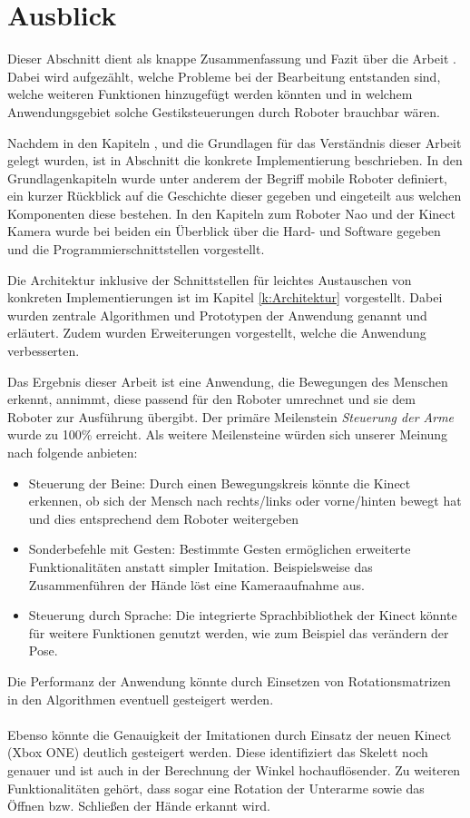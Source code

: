 \chapter{Ausblick}      %
Dieser Abschnitt dient als knappe Zusammenfassung und Fazit über die Arbeit \Titel. Dabei wird aufgezählt, welche Probleme bei der Bearbeitung entstanden sind, welche weiteren Funktionen hinzugefügt werden könnten und in welchem Anwendungsgebiet solche Gestiksteuerungen durch Roboter brauchbar wären.

Nachdem in den Kapiteln ,  und  die Grundlagen für das Verständnis dieser Arbeit gelegt wurden, ist in Abschnitt  die konkrete Implementierung beschrieben. In den Grundlagenkapiteln wurde unter anderem der Begriff mobile Roboter definiert, ein kurzer Rückblick auf die Geschichte dieser gegeben und eingeteilt aus welchen Komponenten diese bestehen. In den Kapiteln zum Roboter Nao und der Kinect Kamera wurde bei beiden ein Überblick über die Hard- und Software gegeben und die Programmierschnittstellen vorgestellt.

Die Architektur inklusive der Schnittstellen für leichtes Austauschen von konkreten Implementierungen ist im Kapitel \ref{k:Architektur} vorgestellt. Dabei wurden zentrale Algorithmen und Prototypen der Anwendung genannt und erläutert. Zudem wurden Erweiterungen vorgestellt, welche die Anwendung verbesserten.

\noindent
Das Ergebnis dieser Arbeit ist eine Anwendung, die Bewegungen des Menschen erkennt, annimmt, diese passend für den Roboter umrechnet und sie dem Roboter zur Ausführung übergibt. Der primäre Meilenstein \textit{Steuerung der Arme} wurde zu 100\% erreicht. Als weitere Meilensteine würden sich unserer Meinung nach folgende anbieten: 
\begin{itemize}
\item Steuerung der Beine: Durch einen Bewegungskreis könnte die Kinect erkennen, ob sich der Mensch  nach rechts/links oder vorne/hinten bewegt hat und dies entsprechend dem Roboter weitergeben
\item Sonderbefehle mit Gesten: Bestimmte Gesten ermöglichen erweiterte Funktionalitäten anstatt simpler Imitation. Beispielsweise das Zusammenführen der Hände löst eine Kameraaufnahme aus. 
\item Steuerung durch Sprache: Die integrierte Sprachbibliothek der Kinect könnte für weitere Funktionen genutzt werden, wie zum Beispiel das verändern der Pose.
\end{itemize}
Die Performanz der Anwendung könnte durch Einsetzen von Rotationsmatrizen in den Algorithmen eventuell gesteigert werden.
\\
\\
\noindent
Ebenso könnte die Genauigkeit der Imitationen durch Einsatz der neuen Kinect (Xbox ONE) deutlich gesteigert werden. Diese identifiziert das Skelett noch genauer und ist auch in der Berechnung der Winkel hochauflösender. Zu weiteren Funktionalitäten gehört, dass sogar eine Rotation der Unterarme sowie das Öffnen bzw. Schließen der Hände erkannt wird.




	